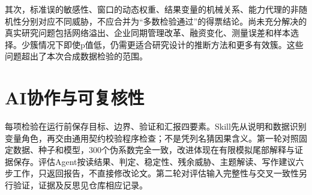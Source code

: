 \documentclass[UTF8,11pt,fontset=none]{ctexart}
\begin{document}
其次，标准误的敏感性、窗口的动态权重、结果变量的机械关系、能力代理的非随机性分别对应不同威胁，不应合并为“多数检验通过”的得票结论。尚未充分解决的真实研究问题包括网络溢出、企业同期管理改革、融资变化、测量误差和样本选择。少簇情况下即使p值低，仍需更适合研究设计的推断方法和更多有效簇。这些问题超出了本次合成数据检验的范围。

\section{AI协作与可复核性}
每项检验在运行前保存目标、边界、验证和汇报四要素。Skill先从说明和数据识别变量角色，再交由通用契约校验程序检查；不是凭列名猜因果含义。第一轮对照固定数据、种子和模型，300个伪系数完全一致，改进体现在有限模拟尾部解释与证据保存。评估Agent按读结果、判定、稳定性、残余威胁、主题解读、写作建议六步工作，只返回报告，不直接修改论文。第二轮对评估输入完整性与交叉一致性另行验证，证据及反思见仓库相应记录。

\appendix
\end{document}
